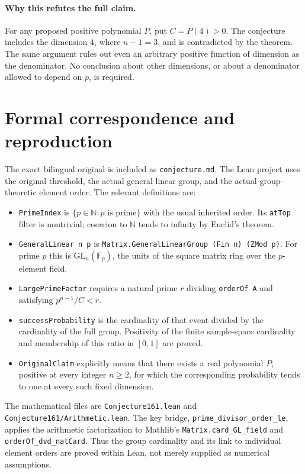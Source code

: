 \documentclass[11pt]{article}
\newcommand{\GL}{\mathrm{GL}}
\newcommand{\Fp}{\mathbb F_p}
\begin{document}
\paragraph{Why this refutes the full claim.}
For any proposed positive polynomial $P$, put $C=P(4)>0$. The conjecture includes
the dimension $4$, where $n-1=3$, and is contradicted by the theorem. The same
argument rules out even an arbitrary positive function of dimension as the
denominator. No conclusion about other dimensions, or about a denominator
allowed to depend on $p$, is required.

\newpage
\section*{Formal correspondence and reproduction}

The exact bilingual original is included as \texttt{conjecture.md}. The Lean
project uses the original threshold, the actual general linear group, and the
actual group-theoretic element order. The relevant definitions are:
\begin{itemize}[leftmargin=1.4em,itemsep=3pt,topsep=3pt]
\item \texttt{PrimeIndex} is $\{p\in\mathbb N:p\text{ is prime}\}$ with the
usual inherited order. Its \texttt{atTop} filter is nontrivial; coercion to
$\mathbb N$ tends to infinity by Euclid's theorem.
\item \texttt{GeneralLinear n p} is
\texttt{Matrix.GeneralLinearGroup (Fin n) (ZMod p)}. For prime $p$ this is
$\GL_n(\Fp)$, the units of the square matrix ring over the $p$-element field.
\item \texttt{LargePrimeFactor} requires a natural prime $r$ dividing
\texttt{orderOf A} and satisfying $p^{n-1}/C<r$.
\item \texttt{successProbability} is the cardinality of that event divided
by the cardinality of the full group. Positivity of the finite sample-space
cardinality and membership of this ratio in $[0,1]$ are proved.
\item \texttt{OriginalClaim} explicitly means that there exists a real
polynomial $P$, positive at every integer $n\ge2$, for which the corresponding
probability tends to one at every such fixed dimension.
\end{itemize}

The mathematical files are \texttt{Conjecture161.lean} and
\texttt{Conjecture161/Arithmetic.lean}. The key bridge,
\nolinkurl{prime_divisor_order_le}, applies the arithmetic factorization to
Mathlib's \nolinkurl{Matrix.card_GL_field} and
\nolinkurl{orderOf_dvd_natCard}. Thus the group cardinality and its link to
individual element orders are proved within Lean, not merely supplied as
numerical assumptions.
\end{document}
